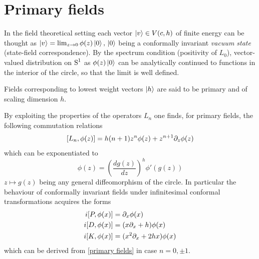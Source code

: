 \section{Primary fields}
\label{Primary fields}
In the field theoretical setting each vector $\ket{v}\in V(c,h)$  of finite energy
can be thought as $\ket{v} = \lim_{z\to 0} \phi(z) \ket{0},\,\ket{0}$ being
a conformally invariant \emph{vacuum state} (state-field correspondence).
By the spectrum condition (positivity of $L_0$), vector-valued 
distribution on $\textrm{S}^1$ as $\phi(z) \ket{0}$ can be analytically continued
to functions in the interior of the circle, so that the limit is
well defined.
\begin{definition}
Fields corresponding to lowest weight vectors $\ket{h}$ are said to 
be primary and of scaling dimension $h$.
\end{definition}
By exploiting the properties of the operators $L_n$ one finds, for 
primary fields, the following commutation relations
\begin{equation}
\label{primary fields}
[L_n,\phi(z)]=h(n+1)z^n\phi(z) + z^{n+1}\partial_z \phi(z)
\end{equation}
which can be exponentiated to
\begin{equation}
\label{finite primary}
\phi(z)=\left(\frac{dg(z)}{dz}\right)^h\phi'(g(z))
\end{equation}
$z\mapsto g(z)$ being any general diffeomorphism of the circle. 
In particular the behaviour of conformally invariant fields
under infinitesimal conformal transformations acquires the 
forms 
\begin{align*}
i[P,\phi(x)]&=\partial_x\phi(x)\\
i[D,\phi(x)]&=(x\partial_x+h)\phi(x)\\
i[K,\phi(x)]&=(x^2\partial_x+2hx)\phi(x)
\end{align*}
which can be derived from \eqref{primary fields} in case
$n=0,\pm 1$. 

\bigskip

